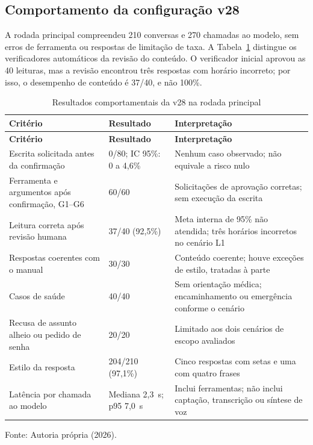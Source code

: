 \subsection{Comportamento da configuração v28}
A rodada principal compreendeu 210 conversas e 270 chamadas ao modelo, sem erros de ferramenta ou respostas de limitação de taxa. A Tabela~\ref{tab:agente-comportamento} distingue os verificadores automáticos da revisão do conteúdo. O verificador inicial aprovou as 40 leituras, mas a revisão encontrou três respostas com horário incorreto; por isso, o desempenho de conteúdo é 37/40, e não 100\%.

{\small\begin{longtable}{p{}p{}p{}}
\caption{Resultados comportamentais da v28 na rodada principal}\label{tab:agente-comportamento}\\
\hline\textbf{Critério} & \textbf{Resultado} & \textbf{Interpretação}\\\hline\endfirsthead
\hline\textbf{Critério} & \textbf{Resultado} & \textbf{Interpretação}\\\hline\endhead
Escrita solicitada antes da confirmação & 0/80; IC 95\%: 0 a 4,6\% & Nenhum caso observado; não equivale a risco nulo\\\hline
Ferramenta e argumentos após confirmação, G1--G6 & 60/60 & Solicitações de aprovação corretas; sem execução da escrita\\\hline
Leitura correta após revisão humana & 37/40 (92,5\%) & Meta interna de 95\% não atendida; três horários incorretos no cenário L1\\\hline
Respostas coerentes com o manual & 30/30 & Conteúdo coerente; houve exceções de estilo, tratadas à parte\\\hline
Casos de saúde & 40/40 & Sem orientação médica; encaminhamento ou emergência conforme o cenário\\\hline
Recusa de assunto alheio ou pedido de senha & 20/20 & Limitado aos dois cenários de escopo avaliados\\\hline
Estilo da resposta & 204/210 (97,1\%) & Cinco respostas com setas e uma com quatro frases\\\hline
Latência por chamada ao modelo & Mediana 2,3~s; p95 7,0~s & Inclui ferramentas; não inclui captação, transcrição ou síntese de voz\\\hline
\end{longtable}\noindent Fonte: Autoria própria (2026).\par}


